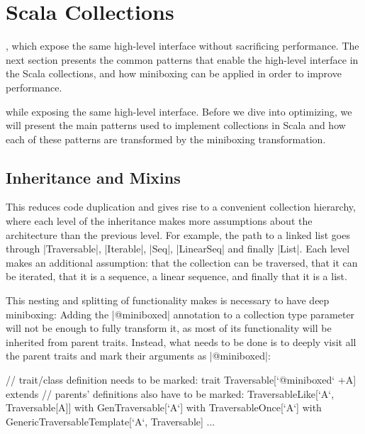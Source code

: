 \section{Scala Collections}


, which expose the same high-level interface without sacrificing performance. The next section presents the common patterns that enable the high-level interface in the Scala collections, and how miniboxing can be applied in order to improve performance.

 while exposing the same high-level interface.
Before we dive into optimizing, we will present the main patterns used to implement collections in Scala and how each of these patterns are transformed by the miniboxing transformation. %

\subsection{Inheritance and Mixins}

 This reduces code duplication and gives rise to a convenient collection hierarchy, where each level of the inheritance makes more assumptions about the architecture than the previous level. For example, the path to a linked list goes through |Traversable|, |Iterable|, |Seq|, |LinearSeq| and finally |List|. Each level makes an additional assumption: that the collection can be traversed, that it can be iterated, that it is a sequence, a linear sequence, and finally that it is a list.

This nesting and splitting of functionality makes is necessary to have deep miniboxing: Adding the |@miniboxed| annotation to a collection type parameter will not be enough to fully transform it, as most of its functionality will be inherited from parent traits. Instead, what needs to be done is to deeply visit all the parent traits and mark their arguments as |@miniboxed|:

\begin{lstlisting-nobreak}
 // trait/class definition needs to be marked:
 trait Traversable[`@miniboxed` +A] extends
 // parents' definitions also have to be marked:
       TraversableLike[`A`, Traversable[A]]
       with GenTraversable[`A`]
       with TraversableOnce[`A`]
       with GenericTraversableTemplate[`A`, Traversable] { ... }
\end{lstlisting-nobreak}

